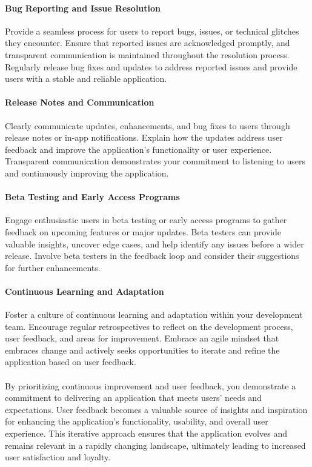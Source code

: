 \paragraph{Bug Reporting and Issue Resolution}
Provide a seamless process for users to report bugs, issues, or technical glitches they encounter. Ensure that 
reported issues are acknowledged promptly, and transparent communication is maintained throughout the resolution 
process. Regularly release bug fixes and updates to address reported issues and provide users with a stable and 
reliable application.

\paragraph{Release Notes and Communication}
Clearly communicate updates, enhancements, and bug fixes to users through release notes or in-app notifications. 
Explain how the updates address user feedback and improve the application's functionality or user experience. 
Transparent communication demonstrates your commitment to listening to users and continuously improving the 
application.

\paragraph{Beta Testing and Early Access Programs}
Engage enthusiastic users in beta testing or early access programs to gather feedback on upcoming features or 
major updates. Beta testers can provide valuable insights, uncover edge cases, and help identify any issues 
before a wider release. Involve beta testers in the feedback loop and consider their suggestions for further 
enhancements.

\paragraph{Continuous Learning and Adaptation}
Foster a culture of continuous learning and adaptation within your development team. Encourage regular retrospectives 
to reflect on the development process, user feedback, and areas for improvement. Embrace an agile mindset that
embraces change and actively seeks opportunities to iterate and refine the application based on user feedback.\\
\\

By prioritizing continuous improvement and user feedback, you demonstrate a commitment to delivering an application 
that meets users' needs and expectations. User feedback becomes a valuable source of insights and inspiration for 
enhancing the application's functionality, usability, and overall user experience. This iterative approach ensures 
that the application evolves and remains relevant in a rapidly changing landscape, ultimately leading to increased 
user satisfaction and loyalty.\\
\\


